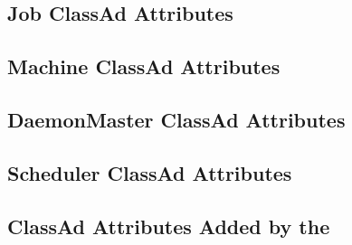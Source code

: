 \subsection*{\label{sec:Job-ClassAd-Attributes}Job ClassAd Attributes}


\subsection*{\label{sec:Machine-ClassAd-Attributes}Machine ClassAd Attributes}


\subsection*{\label{sec:DaemonMaster-ClassAd-Attributes}DaemonMaster ClassAd Attributes}


\subsection*{\label{sec:Scheduler-ClassAd-Attributes}Scheduler ClassAd Attributes}



\subsection*{\label{sec:Collector-Added-Attributes}ClassAd Attributes Added by the }

